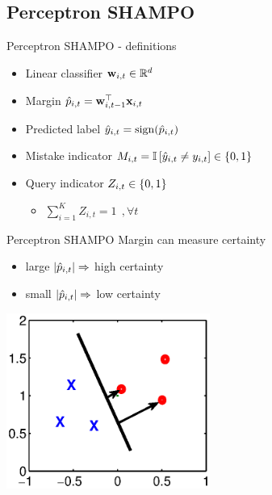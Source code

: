\documentclass{beamer}
\begin{document}
\subsection{Perceptron SHAMPO}

\begin{frame}{Perceptron SHAMPO  - definitions}
\begin{itemize}
\item Linear classifier $\mathbf{w}_{i,t}\in \mathbb{R}^d$ \newline
\item Margin $\hat{p}_{i,t}={\mathbf{w}}^{\top}_{i,t-1}\mathbf{x}_{i,t} $\newline
\item Predicted label $\hat{y}_{i,t}={\rm sign}(\hat{p}_{i,t})$\newline
\item Mistake indicator $M_{i,t}=\mathbb{I}\left[{\hat{y}_{i,t}\ne y_{i,t}}\right]\in\left\{{0,1}\right\}$\newline
\item Query  indicator $Z_{i,t}\in\left\{{0,1}\right\}$\newline
\begin{itemize}
\item $\sum_{i=1}^{K} Z_{i,t}=1 ~~,\forall t$\newline
\end{itemize}
\end{itemize}
\end{frame}


\begin{frame}{Perceptron SHAMPO }
Margin can measure certainty \newline
\begin{itemize}
\item large $\left\vert{\hat{p}_{i,t}}\right\vert\Rightarrow$ high certainty\newline
\item small $\left\vert{\hat{p}_{i,t}}\right\vert\Rightarrow$ low certainty
\end{itemize}
\begin{center}
\includegraphics[width=0.5\textwidth]{figs/margin.eps}
\end{center}
\end{frame}
\end{document}
